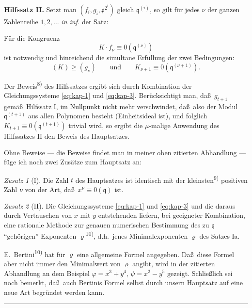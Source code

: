 \documentclass[12pt,a4paper]{article}
\theoremstyle{plain}
\theoremstyle{definition}
\theoremstyle{remark}
\newtheorem*{zusatz}{Zusatz}
\begin{document}
\smallskip
\textbf{Hilfssatz II.} Setzt man $(f_{i}, g_{i}, \mathfrak{p}^{2^{i}})$ gleich
$\mathfrak{q}^{(i)}$, so gilt f\"ur jedes $\nu$ der ganzen Zahlenreihe
$1, 2, \ldots$ \textit{in inf.} der Satz:

F\"ur die Kongruenz
\[
K \cdot f_{\nu} \equiv 0(\mathfrak{q}^{(\nu)})
\]
ist notwendig und hinreichend die simultane Erf\"ullung der zwei
Bedingungen:
\[
(K) \geq (g_{\nu}) \qquad \text{und} \qquad K_{\nu+1} \equiv 0(\mathfrak{q}^{(\nu+1)}).
\]

Der Beweis\textsuperscript{8)} des Hilfssatzes ergibt sich durch Kombination der
Gleichungssysteme \eqref{eq:kap-1} und \eqref{eq:kap-3}. Ber\"ucksichtigt
man, da\ss\ $g_{t+1}$ gem\"a\ss\ Hilfssatz I, im Nullpunkt nicht mehr
verschwindet, da\ss\ also der Modul $\mathfrak{q}^{(t+1)}$ aus allen Polynomen
besteht (Einheitsideal ist), und folglich
$K_{t+1} \equiv 0(\mathfrak{q}^{(t+1)})$ trivial wird, so ergibt die
$\mu$-malige Anwendung des Hilfssatzes II den Beweis des
Hauptsatzes.

\smallskip
Ohne Beweise --- die Beweise findet man in meiner oben zitierten
Abhandlung --- f\"uge ich noch zwei Zus\"atze zum Hauptsatz an:

\begin{zusatz}[I]
Die Zahl $t$ des Hauptsatzes ist identisch mit der kleinsten\textsuperscript{9)}
positiven Zahl $\nu$ von der Art, da\ss\ $x^{\nu} \equiv 0(\mathfrak{q})$ ist.
\end{zusatz}

\begin{zusatz}[II]
Die Gleichungssysteme \eqref{eq:kap-1} und \eqref{eq:kap-3} und die
daraus durch Vertauschen von $x$ mit $y$ entstehenden liefern, bei
geeigneter Kombination, eine rationale Methode zur genauen
numerischen Bestimmung des zu $\mathfrak{q}$ ``geh\"origen''
Exponenten $\varrho$\textsuperscript{10)}, d.h.\ jenes Minimalexponenten $\varrho$
des Satzes Ia.
\end{zusatz}

E.\ Bertini\textsuperscript{10)} hat f\"ur $\varrho$ eine allgemeine Formel angegeben.
Da\ss\ diese Formel aber nicht immer den Minimalwert von $\varrho$
angibt, wird in der zitierten Abhandlung an dem Beispiel
$\varphi = x^{3} + y^{4}$, $\psi = x^{2} - y^{5}$ gezeigt. Schlie\ss lich sei
noch bemerkt, da\ss\ auch Bertinis Formel selbst durch unsern
Hauptsatz auf eine neue Art begr\"undet werden kann.

\vspace{0.5em}
\noindent\rule{\textwidth}{0.4pt}
\vspace{0.3em}
\end{document}

